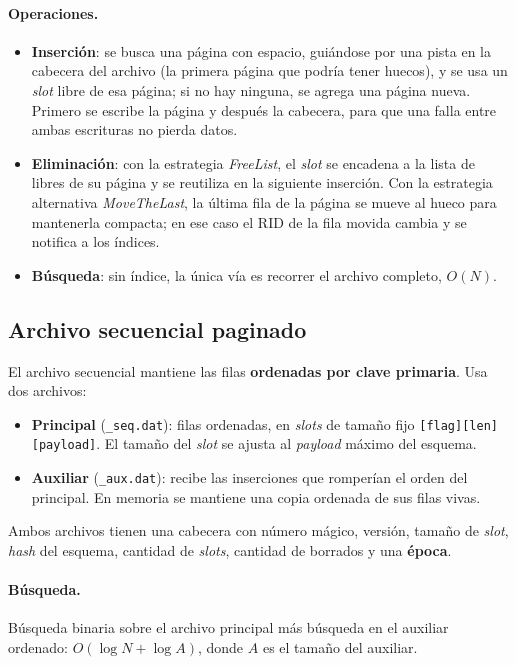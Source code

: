 \documentclass[11pt,a4paper]{article}
\begin{document}
\paragraph{Operaciones.}
\begin{itemize}
  \item \textbf{Inserción}: se busca una página con espacio, guiándose por una pista en la cabecera del archivo (la primera página que podría tener huecos), y se usa un \emph{slot} libre de esa página; si no hay ninguna, se agrega una página nueva. Primero se escribe la página y después la cabecera, para que una falla entre ambas escrituras no pierda datos.
  \item \textbf{Eliminación}: con la estrategia \emph{FreeList}, el \emph{slot} se encadena a la lista de libres de su página y se reutiliza en la siguiente inserción. Con la estrategia alternativa \emph{MoveTheLast}, la última fila de la página se mueve al hueco para mantenerla compacta; en ese caso el RID de la fila movida cambia y se notifica a los índices.
  \item \textbf{Búsqueda}: sin índice, la única vía es recorrer el archivo completo, $O(N)$.
\end{itemize}

\subsection{Archivo secuencial paginado}

El archivo secuencial mantiene las filas \textbf{ordenadas por clave primaria}. Usa dos archivos:

\begin{itemize}
  \item \textbf{Principal} (\texttt{\_seq.dat}): filas ordenadas, en \emph{slots} de tamaño fijo \texttt{[flag][len][payload]}. El tamaño del \emph{slot} se ajusta al \emph{payload} máximo del esquema.
  \item \textbf{Auxiliar} (\texttt{\_aux.dat}): recibe las inserciones que romperían el orden del principal. En memoria se mantiene una copia ordenada de sus filas vivas.
\end{itemize}

Ambos archivos tienen una cabecera con número mágico, versión, tamaño de \emph{slot}, \emph{hash} del esquema, cantidad de \emph{slots}, cantidad de borrados y una \textbf{época}.

\paragraph{Búsqueda.} Búsqueda binaria sobre el archivo principal más búsqueda en el auxiliar ordenado: $O(\log N + \log A)$, donde $A$ es el tamaño del auxiliar.
\end{document}
